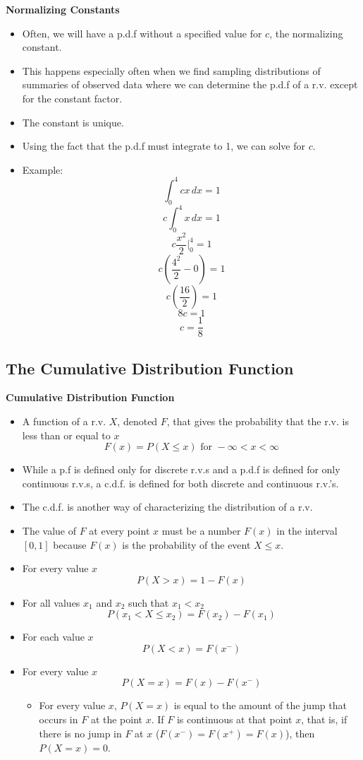 \documentclass[11pt]{article}
\begin{document}
\textbf{Normalizing Constants}
\begin{itemize}
    \item Often, we will have a p.d.f without a specified value for $c$, 
    the normalizing constant. 
    \item This happens especially often when we find sampling distributions 
    of summaries of observed data where we can determine the p.d.f of a 
    r.v. except for the constant factor.
    \item The constant is unique.
    \item Using the fact that the p.d.f must integrate to 1, we can solve 
    for $c$.
    \item Example:
    \[\int_{0}^{4}cx \,dx = 1\]
    \[c\int_{0}^{4}x \,dx = 1\]
    \[c\frac{x^2}{2}\rvert_0^4 = 1\]
    \[c\left(\frac{4^2}{2}-0\right)= 1\]
    \[c\left(\frac{16}{2}\right)= 1\]
    \[8c= 1\]
    \[c= \frac{1}{8}\]
\end{itemize}

\subsection{The Cumulative Distribution Function}   

\textbf{Cumulative Distribution Function}
\begin{itemize}
    \item A function of a r.v. $X$, denoted $F$, that gives the probability that the r.v. is 
    less than or equal to $x$ \[F(x)=P(X \le x) \text{ for } -\infty < x < \infty\]
    \item While a p.f is defined only for discrete r.v.s and a p.d.f is defined for only 
    continuous r.v.s, a c.d.f. is defined for both discrete and continuous r.v.'s.
    \item The c.d.f. is another way of characterizing the distribution of a r.v.
    \item The value of $F$ at every point $x$ must be a number $F(x)$ in the interval $[0,1]$
    because $F(x)$ is the probability of the event ${X \le x}$.
    \item For every value $x$
    \[P(X > x) = 1 - F(x)\]
    \item For all values $x_1$ and $x_2$ such that $x_1 < x_2$
    \[P(x_1 < X \le x_2) = F(x_2) - F(x_1)\]
    \item For each value $x$
    \[P(X < x) = F(x^-)\]
    \item For every value $x$
    \[P(X=x) = F(x) - F(x^-)\]
    \begin{itemize}
        \item For every value $x$, $P(X=x)$ is equal to the amount of the jump that occurs in 
        $F$ at the point $x$. If $F$ is continuous at that point $x$, that is, if there is no 
        jump in $F$ at $x$ ($F(x^-)=F(x^+)=F(x)$), then $P(X=x)=0$.
    \end{itemize}
\end{itemize}
\end{document}
